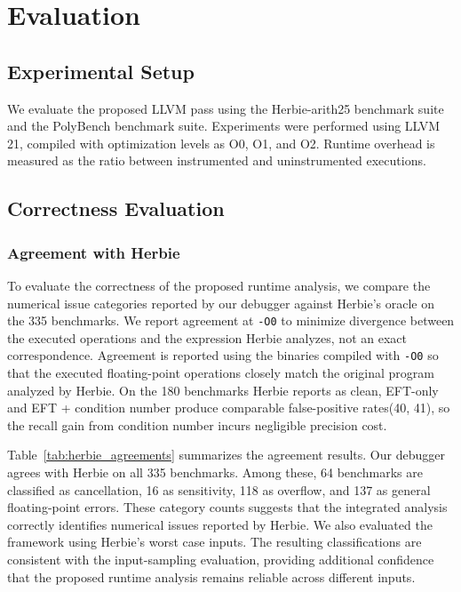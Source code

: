 \section{Evaluation}
\label{sec:evaluation}

\subsection{Experimental Setup}
\label{sec:experiment setup}
We evaluate the proposed LLVM pass using the Herbie-arith25 benchmark suite and the PolyBench benchmark suite. Experiments were performed using LLVM 21, compiled with optimization levels as O0, O1, and O2. Runtime overhead is measured as the ratio between instrumented and uninstrumented executions. 

\subsection{Correctness Evaluation}
\label{sec:correctness}

\subsubsection{Agreement with Herbie}
\label{sec:agreement}
To evaluate the correctness of the proposed runtime analysis, we compare the numerical issue categories reported by our debugger against Herbie’s oracle on the 335 benchmarks. We report agreement at \texttt{-O0} to minimize divergence between the executed operations and the expression Herbie analyzes, not an exact correspondence. Agreement is reported using the binaries compiled with \texttt{-O0} so that the executed floating-point operations closely match the original program analyzed by Herbie. On the 180 benchmarks Herbie reports as clean, EFT-only and EFT + condition number produce comparable false-positive rates(40, 41), so the recall gain from condition number incurs negligible precision cost.



Table~\ref{tab:herbie_agreements} summarizes the agreement results. Our debugger agrees with Herbie on all 335 benchmarks. Among these, 64 benchmarks are classified as cancellation, 16 as sensitivity, 118 as overflow, and 137 as general floating-point errors. These category counts suggests that the integrated analysis correctly identifies numerical issues reported by Herbie. We also evaluated the framework using Herbie's worst case inputs. The resulting classifications are consistent with the input-sampling evaluation, providing additional confidence that the proposed runtime analysis remains reliable across different inputs.


